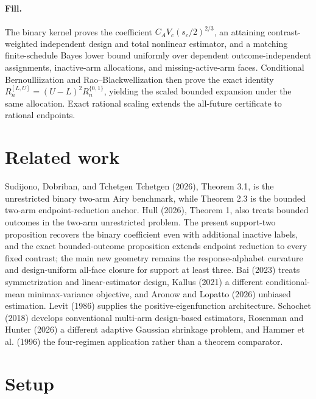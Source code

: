 \documentclass{article}
\begin{document}
\paragraph{Fill.} The binary kernel proves the coefficient \(C_AV_c(s_c/2)^{2/3}\), an attaining contrast-weighted independent design and total nonlinear estimator, and a matching finite-schedule Bayes lower bound uniformly over dependent outcome-independent assignments, inactive-arm allocations, and missing-active-arm faces. Conditional Bernoulliization and Rao--Blackwellization then prove the exact identity \(R_n^{[L,U]}=(U-L)^2R_n^{\{0,1\}}\), yielding the scaled bounded expansion under the same allocation. Exact rational scaling extends the all-future certificate to rational endpoints.

\section{Related work}

Sudijono, Dobriban, and Tchetgen Tchetgen (2026), Theorem 3.1, is the unrestricted binary two-arm Airy benchmark, while Theorem 2.3 is the bounded two-arm endpoint-reduction anchor. Hull (2026), Theorem 1, also treats bounded outcomes in the two-arm unrestricted problem. The present support-two proposition recovers the binary coefficient even with additional inactive labels, and the exact bounded-outcome proposition extends endpoint reduction to every fixed contrast; the main new geometry remains the response-alphabet curvature and design-uniform all-face closure for support at least three. Bai (2023) treats symmetrization and linear-estimator design, Kallus (2021) a different conditional-mean minimax-variance objective, and Aronow and Lopatto (2026) unbiased estimation. Levit (1986) supplies the positive-eigenfunction architecture. Schochet (2018) develops conventional multi-arm design-based estimators, Rosenman and Hunter (2026) a different adaptive Gaussian shrinkage problem, and Hammer et al. (1996) the four-regimen application rather than a theorem comparator.

\section{Setup}
\end{document}
